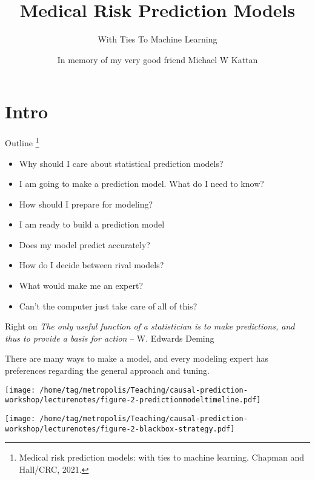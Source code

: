 \documentclass{beamer}\usepackage{listings}
\institute{}
\subtitle{With Ties To Machine Learning}
\author{\vspace{3em}\newline In memory of my very good friend Michael W Kattan}
\date{}
\title{Medical Risk Prediction Models}
\begin{document}
\maketitle
\section{Intro}
\label{sec:org45d25c5}

\begin{frame}[label={sec:orgc97b14e}]{Outline \footnote{Medical risk prediction models: with ties to machine learning. Chapman and Hall/CRC, 2021.}}
\begin{itemize}
\item Why should I care about statistical prediction models?
\item I am going to make a prediction model. What do I need to know?
\item How should I prepare for modeling?
\item I am ready to build a prediction model
\item Does my model predict accurately?
\item How do I decide between rival models?
\item What would make me an expert?
\item Can't the computer just take care of all of this?
\end{itemize}
\end{frame}
\begin{frame}[label={sec:org48a73c1}]{Right on}
\emph{The only useful function of a statistician is to make predictions, and thus to provide a basis for action} -- W. Edwards
Deming \vfill

There are many ways to make a model, and every modeling expert has
preferences regarding the general approach and tuning.
\vfill
\end{frame}
\begin{frame}[label={sec:orge53b543}]{}
\begin{center}
\texttt{[image: /home/tag/metropolis/Teaching/causal-prediction-workshop/lecturenotes/figure-2-predictionmodeltimeline.pdf]}
\end{center}
\end{frame}
\begin{frame}[label={sec:org3255b92}]{}
\begin{center}
\texttt{[image: /home/tag/metropolis/Teaching/causal-prediction-workshop/lecturenotes/figure-2-blackbox-strategy.pdf]}
\end{center}
\end{frame}
\end{document}
